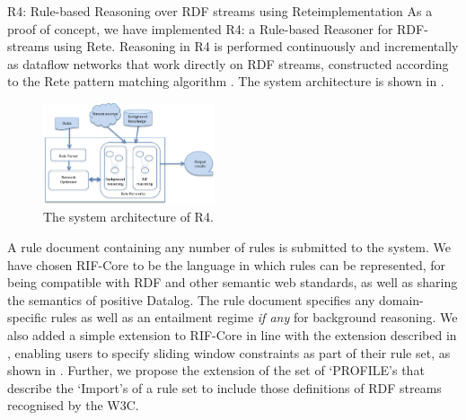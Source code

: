 \begin{nestedsection}{R4: Rule-based Reasoning over RDF streams using Rete}{implementation}
	As a proof of concept, we have implemented R4: a Rule-based Reasoner for RDF-streams using Rete.
	Reasoning in R4 is performed continuously and incrementally as dataflow networks that work directly on RDF streams, constructed according to the Rete pattern matching algorithm \citep{forgy79}.
	The system architecture is shown in .
	\begin{figure}[b]
		\centering
		\includegraphics[width=0.45\textwidth]{R4-architecture.png}
		\caption{The system architecture of R4.}
	\end{figure}

	A rule document containing any number of rules is submitted to the system.
	We have chosen RIF-Core to be the language in which rules can be represented, for being compatible with RDF and other semantic web standards, as well as sharing the semantics of positive Datalog.
	The rule document specifies any domain-specific rules as well as an entailment regime \emph{if any} for background reasoning.
	We also added a simple extension to RIF-Core in line with the extension described in , enabling users to specify sliding window constraints as part of their rule set, as shown in .
	Further, we propose the extension of the set of `PROFILE's that describe the `Import's of a rule set to include those definitions of RDF streams recognised by the W3C.


\end{nestedsection}

